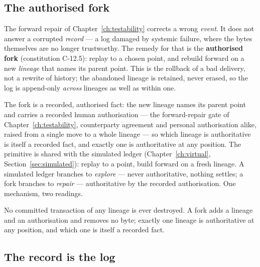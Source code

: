 \subsection{The authorised fork}

The forward repair of Chapter~\ref{ch:testability} corrects a wrong \emph{event}. It does not
answer a corrupted \emph{record} --- a log damaged by systemic failure, where the bytes
themselves are no longer trustworthy. The remedy for that is the \textbf{authorised fork}
(constitution C-12.5): replay to a chosen point, and rebuild forward on a new \emph{lineage}
that names its parent point. This is the rollback of a bad delivery, not a rewrite of history;
the abandoned lineage is retained, never erased, so the log is append-only \emph{across}
lineages as well as within one.

The fork is a recorded, authorised fact: the new lineage names its parent point and carries
a recorded human authorisation --- the forward-repair gate of Chapter~\ref{ch:testability},
counterparty agreement and personal authorisation alike, raised
from a single move to a whole lineage --- so which lineage is authoritative is itself a
recorded fact, and exactly one is authoritative at any position. The primitive is shared
with the simulated ledger (Chapter~\ref{ch:virtual}, Section~\ref{sec:simulated}): replay
to a point, build forward on a fresh lineage. A simulated ledger branches to \emph{explore}
--- never authoritative, nothing settles; a fork branches to \emph{repair} --- authoritative
by the recorded authorisation. One mechanism, two readings.

\begin{invariant}\label{inv:lineage}
No committed transaction of any lineage is ever destroyed. A fork adds a lineage and an
authorisation and removes no byte; exactly one lineage is authoritative at any position, and
which one is itself a recorded fact.
\end{invariant}

\subsection{The record is the log}\label{sec:record-is-log}

